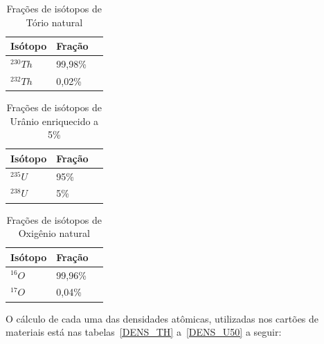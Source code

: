 \documentclass[
	12pt,				%
	openany,			%
	twoside,			%
	a4paper,			%
	english,			%
	french,				%
	spanish,			%
	brazil				%
	]{abntex2}
\begin{document}
\begin{center}
\begin{longtable}{|l|l|l|}
\caption[Frações de isótopos de Tório natural\cite{19kaeri}]{Frações de isótopos de Tório natural\cite{19kaeri}}

\label{FRACTIONS_TH} \\

\hline 
Isótopo & Fração\tabularnewline
\hline 
\hline 
$^{230}Th$  & 99,98\%\tabularnewline
\hline 
$^{232}Th$  & 0,02\%\tabularnewline
\hline 
\end{longtable}

\begin{longtable}{|l|l|l|}
\caption[Frações de isótopos de Urânio enriquecido a 5\%\cite{19kaeri}]{Frações de isótopos de Urânio enriquecido a 5\%\cite{19kaeri}}

\label{FRACTIONS_U5} \\

\hline 
Isótopo & Fração\tabularnewline
\hline 
\hline 
$^{235}U$  & 95\%\tabularnewline
\hline 
$^{238}U$  & 5\%\tabularnewline
\hline 
\end{longtable}

\begin{longtable}{|l|l|l|}
\caption[ Frações de isótopos de Oxigênio natural\cite{19kaeri}]{ Frações de isótopos de Oxigênio natural\cite{19kaeri}}

\label{FRACTIONS_O} \\

\hline 
Isótopo & Fração\tabularnewline
\hline 
\hline 
$^{16}O$  & 99,96\%\tabularnewline
\hline 
$^{17}O$  & 0,04\%\tabularnewline
\hline 
\end{longtable}
\end{center}

O cálculo de cada uma das densidades atômicas, utilizadas nos cartões de materiais está nas tabelas~\ref{DENS_TH} a~\ref{DENS_U50} a seguir:
\end{document}
